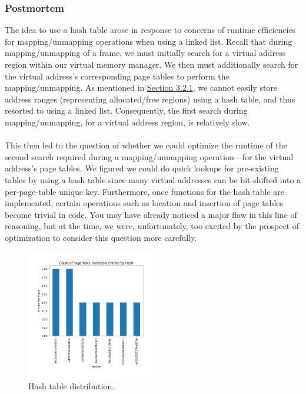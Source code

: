 \subsubsection{Postmortem}
The idea to use a hash table arose in response to concerns of runtime efficiencies for mapping/unmapping operations when using a linked list. Recall that during mapping/unmapping of a frame, we must initially search for a virtual address region within our virtual memory manager. We then must additionally search for the virtual address's corresponding page tables to perform the mapping/unmapping. As mentioned in \hyperref[m2-2]{Section 3.2.1}, we cannot easily store address ranges (representing allocated/free regions) using a hash table, and thus resorted to using a linked list. Consequently, the first search during mapping/unmapping, for a virtual address region, is relatively slow.
\\\\
This then led to the question of whether we could optimize the runtime of the second search required during a mapping/unmapping operation---for the virtual address's page tables. We figured we could do quick lookups for pre-existing tables by using a hash table since many virtual addresses can be bit-shifted into a per-page-table unique key. Furthermore, once functions for the hash table are implemented, certain operations such as location and insertion of page tables become trivial in code. You may have already noticed a major flaw in this line of reasoning, but at the time, we were, unfortunately, too excited by the prospect of optimization to consider this question more carefully. 
\begin{figure}
    \centering
    \includegraphics[width=0.5\textwidth]{images/m2_histogram.jpg}
    \caption{Hash table distribution.}
    \label{figure:m2_histogram}
\end{figure}
\\\\
